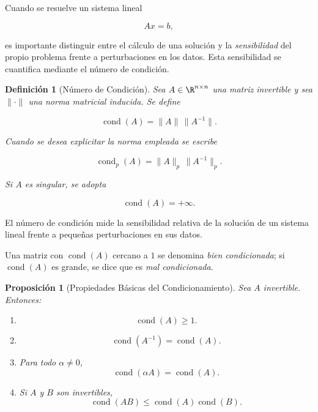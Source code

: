 \documentclass[12pt]{article}
\DeclareMathOperator{\cond}{cond}
\newtheorem{definicion}{Definición}
\newtheorem{proposicion}{Proposición}
\begin{document}
Cuando se resuelve un sistema lineal

\[
    Ax=b,
\]

es importante distinguir entre el cálculo de una solución y la
\emph{sensibilidad} del propio problema frente a perturbaciones en
los datos. Esta sensibilidad se cuantifica mediante el número de
condición.

\begin{definicion}[Número de Condición]
Sea $A\in\R^{n\times n}$ una matriz invertible y sea
$\|\cdot\|$ una norma matricial inducida. Se define

\[
    \boxed{
    \cond(A)
    =
    \|A\|\,\|A^{-1}\|
    }.
\]

Cuando se desea explicitar la norma empleada se escribe

\[
    \cond_p(A)
    =
    \|A\|_p\,\|A^{-1}\|_p.
\]

Si $A$ es singular, se adopta

\[
    \cond(A)=+\infty.
\]
\end{definicion}

El número de condición mide la sensibilidad relativa de la solución
de un sistema lineal frente a pequeñas perturbaciones en sus datos.

Una matriz con $\cond(A)$ cercano a $1$ se denomina
\emph{bien condicionada}; si $\cond(A)$ es grande, se dice que es
\emph{mal condicionada}.

\begin{proposicion}[Propiedades Básicas del Condicionamiento]
Sea $A$ invertible. Entonces:

\begin{enumerate}
    \item
    \[
        \boxed{\cond(A)\geq 1.}
    \]

    \item
    \[
        \boxed{\cond(A^{-1})=\cond(A).}
    \]

    \item Para todo $\alpha\neq0$,
    \[
        \boxed{\cond(\alpha A)=\cond(A).}
    \]

    \item Si $A$ y $B$ son invertibles,
    \[
        \boxed{
        \cond(AB)
        \leq
        \cond(A)\cond(B).
        }
    \]
\end{enumerate}
\end{proposicion}
\end{document}
